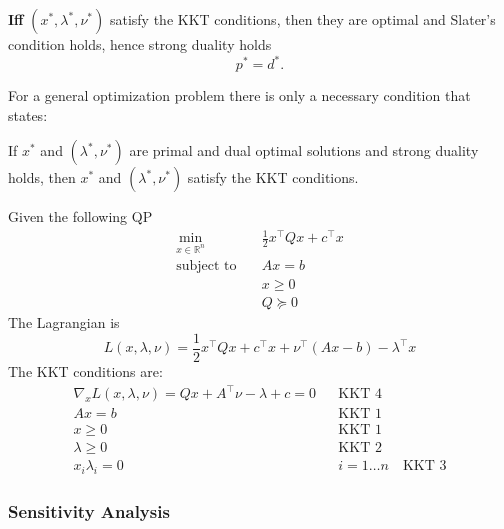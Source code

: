 \textbf{Iff} $(x^*,\lambda^*,\nu^*)$ satisfy the KKT conditions, then they are optimal and Slater's condition holds, hence strong duality holds\begin{equation*}
    p^*=d^*.
\end{equation*}

\newpar{}

For a general optimization problem there is only a necessary condition that states:

If $x^*$ and $(\lambda^*,\nu^*)$ are primal and dual optimal solutions and strong duality holds, then $x^*$ and $(\lambda^*,\nu^*)$ satisfy the KKT conditions.

\begin{examplesection}
    Given the following QP
    \begin{align*}
        \min_{x\in\mathbb{R}^n} & \frac{1}{2}x^\top Qx + c^\top x \\
        \text{subject to}\quad  & Ax=b                            \\
                                & x\geq 0                         \\
                                & Q \succeq 0
    \end{align*}
    The Lagrangian is
    \begin{equation*}
        L(x,\lambda,\nu) = \frac{1}{2}x^\top Qx +c^\top x +\nu^\top(Ax-b) -\lambda^\top x
    \end{equation*}
    The KKT conditions are:
    \begin{align*}
        \nabla_x L(x,\lambda,\nu) = Qx + A^\top \nu -\lambda +c = 0 &  & \text{KKT 4}                  \\
        Ax=b                                                        &  & \text{KKT 1}                  \\
        x\geq 0                                                     &  & \text{KKT 1}                  \\
        \lambda \geq 0                                              &  & \text{KKT 2}                  \\
        x_i\lambda_i = 0                                            &  & i=1\ldots n \quad\text{KKT 3}
    \end{align*}
\end{examplesection}

\subsubsection{Sensitivity Analysis}

